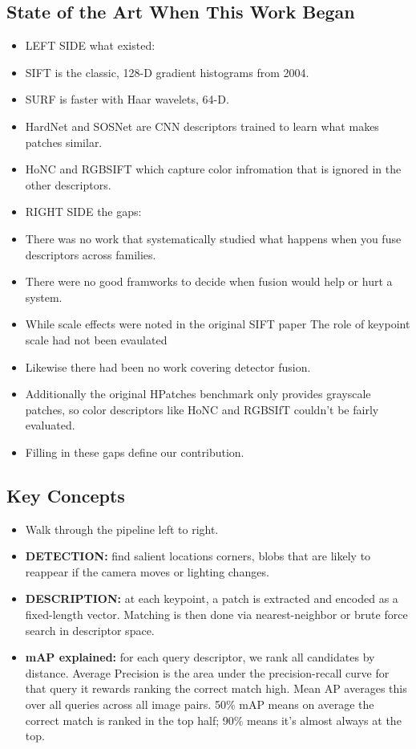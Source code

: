 \documentclass[11pt, letterpaper]{article}
\begin{document}
\subsection{State of the Art When This Work Began}
\begin{itemize}
  \item LEFT SIDE what existed: 
  \item SIFT is the classic, 128-D gradient histograms from 2004. 
  \item SURF is faster with Haar wavelets, 64-D. 
  \item HardNet and SOSNet are CNN descriptors trained to learn what makes patches similar. 
  \item HoNC and RGBSIFT which capture color infromation that is ignored in the other descriptors.
  \item RIGHT SIDE the gaps: 
  \item There was no work that systematically studied what happens when you fuse descriptors across families. 
  \item There were no good framworks to decide when fusion would help or hurt a system.
  \item While scale effects were noted in the original SIFT paper The role of keypoint scale had not been evaulated
  \item Likewise there had been no work covering detector fusion.
  \item Additionally the original HPatches benchmark only provides grayscale patches, so color descriptors like HoNC and RGBSIfT couldn't be fairly evaluated.
  \item Filling in these gaps define our contribution.
\end{itemize}

\subsection{Key Concepts}
\begin{itemize}
  \item Walk through the pipeline left to right.
  \item \textbf{DETECTION:} find salient locations corners, blobs that are likely to reappear if the camera moves or lighting changes.
  \item \textbf{DESCRIPTION:} at each keypoint, a patch is extracted and encoded as a fixed-length vector. Matching is then done via nearest-neighbor or brute force search in descriptor space.
  \item \textbf{mAP explained:} for each query descriptor, we rank all candidates by distance. Average Precision is the area under the precision-recall curve for that query it rewards ranking the correct match high. Mean AP averages this over all queries across all image pairs. 50\% mAP means on average the correct match is ranked in the top half; 90\% means it's almost always at the top.
\end{itemize}
\end{document}
